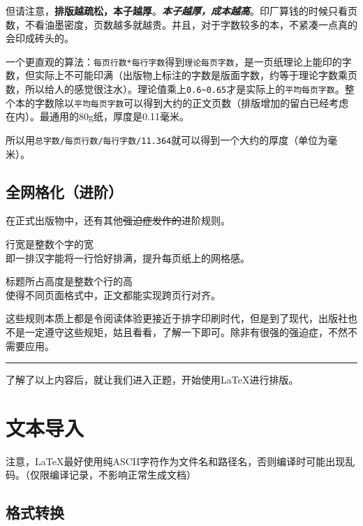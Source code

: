 \documentclass[10pt,openany]{book}
\begin{document}
\begin{sloppypar}
但请注意，\textbf{排版越疏松，本子越厚}。\textbf{\textit{本子越厚，成本越高}}。印厂算钱的时候只看页数，不看油墨密度，页数越多就越贵。并且，对于字数较多的本，不紧凑一点真的会印成砖头的。

一个更直观的算法：\texttt{每页行数*每行字数}得到\texttt{理论每页字数}，是一页纸理论上能印的字数，但实际上不可能印满（出版物上标注的字数是版面字数，约等于理论字数乘页数，所以给人的感觉很注水）。理论值乘上\texttt{0.6\textasciitilde{}0.65}才是实际上的\texttt{平均每页字数}。整个本的字数除以\texttt{平均每页字数}可以得到大约的正文页数（排版增加的留白已经考虑在内）。最通用的80g纸，厚度是0.11毫米。

所以用\texttt{总字数/每页行数/每行字数/11.364}就可以得到一个大约的厚度（单位为毫米）。

\section{全网格化（进阶）}

在正式出版物中，还有其他\sout{强迫症发作的}进阶规则。

\begin{tightenum}
    \item   行宽是整数个字的宽\\即一排汉字能将一行恰好排满，提升每页纸上的网格感。
    \item   标题所占高度是整数个行的高\\使得不同页面格式中，正文都能实现跨页行对齐。
\end{tightenum}

这些规则本质上都是令阅读体验更接近于排字印刷时代，但是到了现代，出版社也不是一定遵守这些规矩，姑且看看，了解一下即可。除非有很强的强迫症，不然不需要应用。

\begin{center}\rule{0.5\linewidth}{0.5pt}\end{center}

了解了以上内容后，就让我们进入正题，开始使用{\LaTeX}进行排版。

\chapter{文本导入}

注意，{\LaTeX}最好使用纯ASCII字符作为文件名和路径名，否则编译时可能出现乱码。（仅限编译记录，不影响正常生成文档）

\section{格式转换}


\end{sloppypar}
\end{document}
